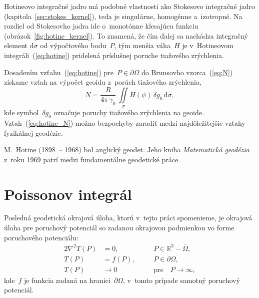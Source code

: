 \documentclass[a4paper, 12pt]{book}
\newcommand{\diff}{\mathrm d}
\begin{document}
Hotineovo integračné jadro má podobné vlastnosti ako Stokesovo integračné jadro 
(kapitola~\ref{sec:stokes_kernel}), teda je singulárne, homogénne a~izotropné.  
Na rozdiel od Stokesovho jadra ide o~monotónne klesajúcu funkciu 
(obrázok~\ref{fig:hotine_kernel}).  To znamená, že čím ďalej sa nachádza 
integračný element $\diff\sigma$ od výpočtového bodu~$P$, tým menšia váha~$H$ 
je v~Hotineovom integráli~(\ref{eq:hotine}) pridelená príslušnej poruche 
tiažového zrýchlenia.

Dosadením vzťahu~(\ref{eq:hotine}) pre~$P \in \partial\Omega$ do Brunsovho 
vzorca~(\ref{eq:N}) získame vzťah na výpočet geoidu z~porúch tiažového 
zrýchlenia,
%
\begin{equation}
\label{eq:hotine_N}
N = \frac{R}{4\pi \, \gamma_0} \, \iint\limits_{\sigma} H(\psi) \, \delta g_0 
\, \diff \sigma{,}
\end{equation}
%
kde symbol~$\delta g_0$ označuje poruchy tiažového zrýchlenia na geoide.  
Vzťah~(\ref{eq:hotine_N}) možno bezpochyby zaradiť medzi najdôležitejšie vzťahy 
fyzikálnej geodézie.

M.~Hotine (1898~-- 1968) bol anglický geodet.  Jeho kniha \textit{Matematická 
geodézia} z~roku 1969 patrí medzi fundamentálne geodetické práce.

\section{Poissonov integrál}
\label{sec:poisson_integral}

Posledná geodetická okrajová úloha, ktorú v~tejto práci spomenieme, je okrajová 
úloha pre poruchový potenciál so zadanou okrajovou podmienkou vo forme 
poruchového potenciálu:
%
\begin{alignat}{2}
\nabla^2 T(P) &= 0{,} &&P \in \mathbb{R}^3 
- \overline\Omega{,}\label{eq:bvp_t_laplace}\\
%
T(P) &= f(P){,} \quad &&P \in 
\partial\Omega{,}\label{eq:bvp_t_boundary_condition}\\
%
T(P) &\rightarrow 0 &&\textrm{pre} \quad P \rightarrow 
\infty{,}\label{eq:bvp_t_t_infty}
\end{alignat}
%
kde~$f$ je funkcia zadaná na hranici~$\partial\Omega$, v~tomto prípade samotný 
poruchový potenciál.
\end{document}
